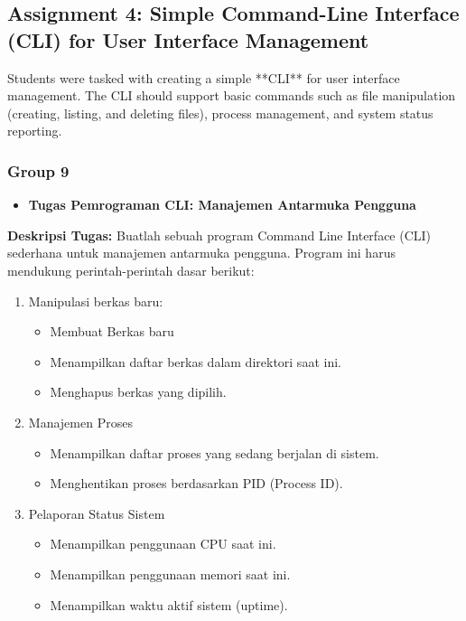 \documentclass[12pt]{article}
\begin{document}
\subsection{Assignment 4: Simple Command-Line Interface (CLI) for User Interface Management}
Students were tasked with creating a simple **CLI** for user interface management. The CLI should support basic commands such as file manipulation (creating, listing, and deleting files), process management, and system status reporting.

\subsubsection{Group 9}
\begin{itemize}
    \item \textbf{Tugas Pemrograman CLI: Manajemen Antarmuka Pengguna}
\end{itemize}
\par \textbf{Deskripsi Tugas:} Buatlah sebuah program Command Line Interface (CLI) sederhana untuk manajemen antarmuka pengguna. Program ini harus mendukung perintah-perintah dasar berikut:
\begin{enumerate}
    \item Manipulasi berkas baru:
    \begin{itemize}
        \item Membuat Berkas baru
        \item Menampilkan daftar berkas dalam direktori saat ini.
        \item Menghapus berkas yang dipilih.
    \end{itemize}
    \item Manajemen Proses
    \begin{itemize}
        \item Menampilkan daftar proses yang sedang berjalan di sistem.
        \item Menghentikan proses berdasarkan PID (Process ID).
    \end{itemize}
    \item Pelaporan Status Sistem
    \begin{itemize}
        \item Menampilkan penggunaan CPU saat ini.
        \item Menampilkan penggunaan memori saat ini.
        \item Menampilkan waktu aktif sistem (uptime).
    \end{itemize}
\end{enumerate}
\end{document}
